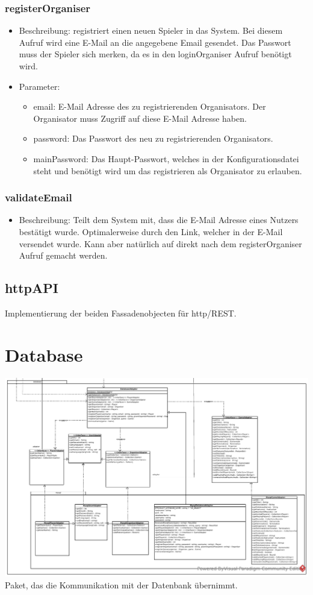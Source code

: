 \documentclass[a4paper]{scrreprt}
\begin{document}
    \subsubsection{registerOrganiser}
    \begin{itemize}
        \item Beschreibung: registriert einen neuen Spieler in das System. Bei diesem Aufruf wird eine E-Mail an die angegebene Email gesendet. Das Passwort muss der Spieler sich merken, da es in den loginOrganiser Aufruf benötigt wird.
        \item Parameter:
        \begin{itemize}
            \item email: E-Mail Adresse des zu registrierenden Organisators. Der Organisator muss Zugriff auf diese E-Mail Adresse haben.
            \item password: Das Passwort des neu zu registrierenden Organisators.
            \item mainPassword: Das Haupt-Passwort, welches in der Konfigurationsdatei steht und benötigt wird um das registrieren als Organisator zu erlauben.
        \end{itemize}
    \end{itemize}
    \subsubsection{validateEmail}
    \begin{itemize}
        \item Beschreibung: Teilt dem System mit, dass die E-Mail Adresse eines Nutzers bestätigt wurde. Optimalerweise durch den Link, welcher in der E-Mail versendet wurde. Kann aber natürlich auf direkt nach dem registerOrganiser Aufruf gemacht werden.
    \end{itemize}
    \subsection{httpAPI}
    Implementierung der beiden Fassadenobjecten für http/REST.

    \section{Database}
    \includegraphics[width=\textwidth]{img/package/database.pdf}
    Paket, das die Kommunikation mit der Datenbank übernimmt.
\end{document}
